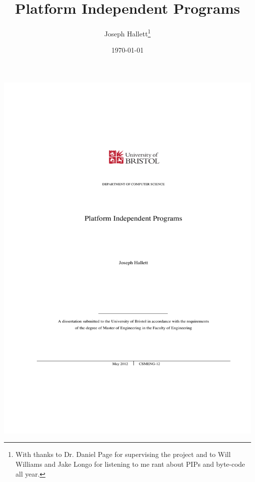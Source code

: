 \documentclass[10pt,]{book}
\title{Platform Independent Programs}
\author{Joseph
                Hallett\thanks{With thanks to Dr. Daniel Page for supervising the project and to Will Williams and Jake Longo for listening to me rant about PIPs and byte-code all year.}}
\date{\today}
\begin{document}
\includegraphics[width=\linewidth]{Cover.pdf}
\end{document}
